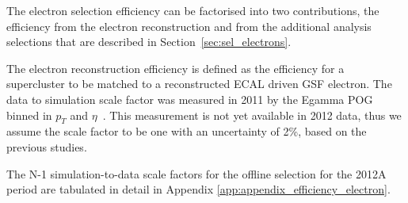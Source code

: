 
The electron selection efficiency can be factorised into two contributions,
the efficiency from the electron reconstruction and from the additional
analysis selections that are described in Section~\ref{sec:sel_electrons}.

The electron reconstruction efficiency is defined as the efficiency for a
supercluster to be matched to a reconstructed ECAL driven GSF electron.
The data to simulation scale factor was measured in 2011 by the Egamma POG binned in
$p_T$ and $\eta$~\cite{ref:egamma_eff_gsf}. This measurement is not yet
available in 2012 data, thus we assume the scale factor to be one with an 
uncertainty of 2\%, based on the previous studies.

The N-1 simulation-to-data scale factors for the offline selection
for the 2012A period
are tabulated in detail in Appendix \ref{app:appendix_efficiency_electron}. 

